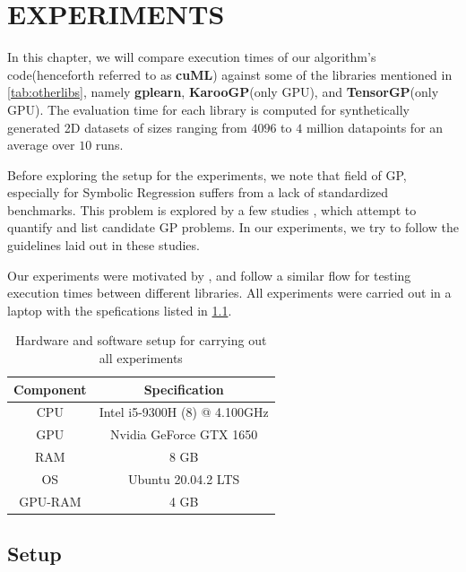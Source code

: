 \chapter{EXPERIMENTS}
\label{chap:experiments}

In this chapter, we will compare execution times of our algorithm's code(henceforth referred to as \textbf{cuML}) against some of the libraries mentioned in \cref{tab:otherlibs}, namely \textbf{gplearn}, \textbf{KarooGP}(only GPU), and \textbf{TensorGP}(only GPU). The evaluation time for each library is computed for synthetically generated 2D datasets of sizes ranging from $4096$ to $4$ million datapoints for an average over $10$ runs. 

Before exploring the setup for the experiments, we note that field of GP, especially for Symbolic Regression suffers from a lack of standardized benchmarks. This problem is explored by a few studies \citep{GP_Better_Benchmarks}\citep{Orzechowski_2018}, which attempt to quantify and list candidate GP problems. In our experiments, we try to follow the guidelines laid out in these studies.

Our experiments were motivated by \citep{baeta2021speed}, and follow a similar flow for testing execution times between different libraries. All experiments were carried out in a laptop with the spefications listed in \cref*{tab:laptop}.

\begin{table}[htbp]
  \caption{Hardware and software setup for carrying out all experiments}
  \begin{center}
      \begin{tabular}[c]{cc}%
        \toprule
        \textbf{Component} &   \textbf{Specification} \\
        \midrule
        CPU & Intel i5-9300H (8) @ 4.100GHz \\
        GPU & Nvidia GeForce GTX 1650       \\
        RAM & 8 GB                          \\
        OS  & Ubuntu 20.04.2 LTS            \\
        GPU-RAM& 4 GB          \\
        \bottomrule
      \end{tabular}
      \label{tab:laptop}
  \end{center}
\end{table}

\section{Setup}
\label{sec:setup}
